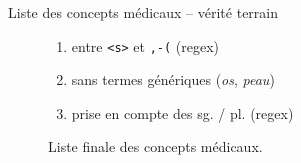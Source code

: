 \begin{frame}{Liste des concepts médicaux -- vérité terrain}
\begin{figure}[!htb]
\begin{minipage}{.5\textwidth}
		\caption{Liste finale des concepts médicaux.}
		\label{fig:prob1_6_2}
	\end{minipage}%
	\begin{minipage}{.6\textwidth}
		\centering
		\begin{enumerate}
			\setcounter{enumi}{0}
			\item entre \texttt{<s>} et \texttt{,-(} (regex)
			\item sans termes génériques (\textit{os}, \textit{peau})
			\item prise en compte des sg. / pl. (regex)
		\end{enumerate}
	\end{minipage}
\end{figure}
\end{frame}

